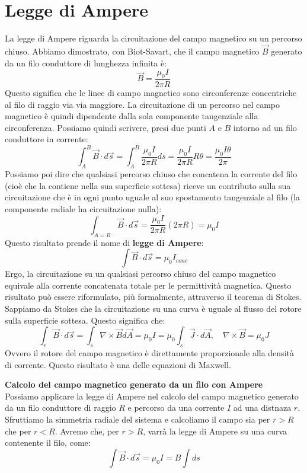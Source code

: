 \documentclass[a4paper,12pt]{article}
\begin{document}
\section{Legge di Ampere}
La legge di Ampere riguarda la circuitazione del campo magnetico su un percorso chiuso. Abbiamo dimostrato, con Biot-Savart, che il campo magnetico $\vec{B}$ generato da un filo conduttore di lunghezza infinita è:
$$ \vec{B} = \frac{\mu_0 I}{2\pi R} $$
Questo significa che le linee di campo magnetico sono circonferenze concentriche al filo di raggio via via maggiore. La circuitazione di un percorso nel campo magnetico è quindi dipendente dalla sola componente tangenziale
alla circonferenza. Possiamo quindi scrivere, presi due punti $A$ e $B$ intorno ad un filo conduttore in corrente:
$$ \int_A^B \vec{B} \cdot d\vec{s} = \int_A^B \frac{\mu_0I}{2\pi R}ds = \frac{\mu_0 I}{2\pi R}R\theta = \frac{\mu_0 I \theta}{2\pi} $$
Possiamo poi dire che qualsiasi percorso chiuso che concatena la corrente del filo (cioè che la contiene nella sua superficie sottesa)
riceve un contributo sulla sua circuitazione che è in ogni punto uguale al suo spostamento tangenziale al filo (la componente radiale ha circuitazione nulla):
$$ \int_{A=B} \vec{B} \cdot d\vec{s} = \frac{\mu_0 I}{2\pi R}(2\pi R) = \mu_0 I $$
Questo risultato prende il nome di \textbf{legge di Ampere}:
$$ \int \vec{B} \cdot d\vec{s} = \mu_0 I_{conc} $$
Ergo, la circuitazione su un qualsiasi percorso chiuso del campo magnetico equivale alla corrente concatenata totale per le permittività magnetica. Questo risultato può essere riformulato, più formalmente, attraverso
il teorema di Stokes. Sappiamo da Stokes che la circuitazione su una curva è uguale al flusso del rotore sulla superficie sottesa. Questo significa che:
$$ \int_r \vec{B} \cdot d\vec{s} = \int_s \nabla \times \vec{B} d\vec{A} = \mu_0 I = \mu_0 \int_s \vec{J} \cdot d\vec{A}, \quad \nabla \times \vec{B} = \mu_0 J$$
Ovvero il rotore del campo magnetico è direttamente proporzionale alla densità di corrente. Questo risultato è una delle equazioni di Maxwell.
\par\smallskip
\textbf{Calcolo del campo magnetico generato da un filo con Ampere} \\
Possiamo applicare la legge di Ampere nel calcolo del campo magnetico generato da un filo conduttore di raggio $R$ e percorso da una corrente $I$ ad una distnaza $r$. Sfruttiamo la simmetria radiale del sistema
e calcoliamo il campo sia per $r > R$ che per $r < R$. Avremo che, per $r > R$, varrà la legge di Ampere su una curva contenente il filo, come:
$$ \int \vec{B} \cdot d\vec{s} = \mu_0 I = B\int ds $$
\end{document}
